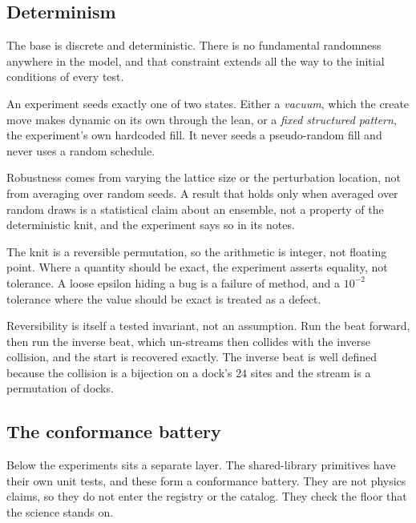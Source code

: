 \subsection{Determinism}

The base is discrete and deterministic. There is no fundamental randomness anywhere in the model, and that constraint extends all the way to the initial conditions of every test.

\begin{definition}
An experiment seeds exactly one of two states. Either a \emph{vacuum}, which the create move makes dynamic on its own through the lean, or a \emph{fixed structured pattern}, the experiment's own hardcoded fill. It never seeds a pseudo-random fill and never uses a random schedule.
\end{definition}

\begin{principle}
Robustness comes from varying the lattice size or the perturbation location, not from averaging over random seeds. A result that holds only when averaged over random draws is a statistical claim about an ensemble, not a property of the deterministic knit, and the experiment says so in its notes.
\end{principle}

The knit is a reversible permutation, so the arithmetic is integer, not floating point. Where a quantity should be exact, the experiment asserts equality, not tolerance. A loose epsilon hiding a bug is a failure of method, and a $10^{-2}$ tolerance where the value should be exact is treated as a defect.

Reversibility is itself a tested invariant, not an assumption. Run the beat forward, then run the inverse beat, which un-streams then collides with the inverse collision, and the start is recovered exactly. The inverse beat is well defined because the collision is a bijection on a dock's $24$ sites and the stream is a permutation of docks.

\subsection{The conformance battery}

Below the experiments sits a separate layer. The shared-library primitives have their own unit tests, and these form a conformance battery. They are not physics claims, so they do not enter the registry or the catalog. They check the floor that the science stands on.

